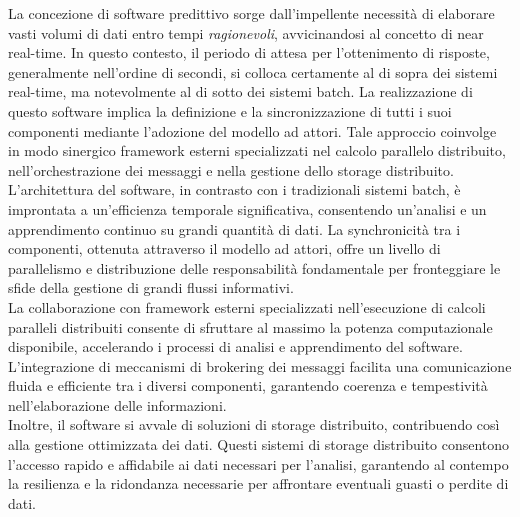 La concezione di software predittivo sorge dall'impellente necessità di elaborare vasti volumi di dati entro tempi \textit{ragionevoli}, avvicinandosi al concetto di near real-time.
In questo contesto, il periodo di attesa per l'ottenimento di risposte, generalmente nell'ordine di secondi, si colloca certamente al di sopra dei sistemi real-time, ma notevolmente al di sotto dei sistemi batch.
La realizzazione di questo software implica la definizione e la sincronizzazione di tutti i suoi componenti mediante l'adozione del modello ad attori.
Tale approccio coinvolge in modo sinergico framework esterni specializzati nel calcolo parallelo distribuito, nell'orchestrazione dei messaggi e nella gestione dello storage distribuito. \\
L'architettura del software, in contrasto con i tradizionali sistemi batch, è improntata a un'efficienza temporale significativa, consentendo un'analisi e un apprendimento continuo su grandi quantità di dati.
La synchronicità tra i componenti, ottenuta attraverso il modello ad attori, offre un livello di parallelismo e distribuzione delle responsabilità fondamentale per fronteggiare le sfide della gestione di grandi flussi informativi. \\
La collaborazione con framework esterni specializzati nell'esecuzione di calcoli paralleli distribuiti consente di sfruttare al massimo la potenza computazionale disponibile, accelerando i processi di analisi e apprendimento del software.
L'integrazione di meccanismi di brokering dei messaggi facilita una comunicazione fluida e efficiente tra i diversi componenti, garantendo coerenza e tempestività nell'elaborazione delle informazioni. \\
Inoltre, il software si avvale di soluzioni di storage distribuito, contribuendo così alla gestione ottimizzata dei dati.
Questi sistemi di storage distribuito consentono l'accesso rapido e affidabile ai dati necessari per l'analisi, garantendo al contempo la resilienza e la ridondanza necessarie per affrontare eventuali guasti o perdite di dati.

